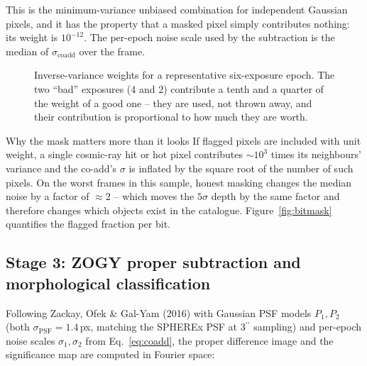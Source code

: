 \documentclass[11pt,a4paper]{article}
\newcommand{\arcsec}{\ensuremath{{}^{\prime\prime}}}
\begin{document}
This is the minimum-variance unbiased combination for independent Gaussian pixels, and it has the
property that a masked pixel simply contributes nothing: its weight is $10^{-12}$. The per-epoch
noise scale used by the subtraction is the median of $\sigma_{\mathrm{coadd}}$ over the frame.

\begin{figure}[H]
\centering
{}
\caption{Inverse-variance weights for a representative six-exposure epoch. The two ``bad'' exposures
(4 and 2) contribute a tenth and a quarter of the weight of a good one -- they are used, not thrown
away, and their contribution is proportional to how much they are worth.}
\label{fig:weights}
\end{figure}

\begin{keybox}{Why the mask matters more than it looks}
If flagged pixels are included with unit weight, a single cosmic-ray hit or hot pixel contributes
$\sim$$10^{3}$ times its neighbours' variance and the co-add's $\sigma$ is inflated by the square root
of the number of such pixels. On the worst frames in this sample, honest masking changes the median
noise by a factor of $\approx 2$ -- which moves the $5\sigma$ depth by the same factor and therefore
changes which objects exist in the catalogue. Figure~\ref{fig:bitmask} quantifies the flagged
fraction per bit.
\end{keybox}

\subsection{Stage 3: ZOGY proper subtraction and morphological classification}
\label{sec:zogy}

Following Zackay, Ofek \& Gal-Yam (2016) with Gaussian PSF models $P_1, P_2$ (both
$\sigma_{\mathrm{PSF}} = 1.4$\,px, matching the SPHEREx PSF at $3\arcsec$ sampling) and per-epoch
noise scales $\sigma_1, \sigma_2$ from Eq.~\ref{eq:coadd}, the proper difference image and the
significance map are computed in Fourier space:
\end{document}
